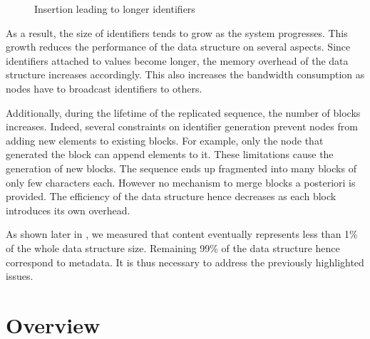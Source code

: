 \documentclass[10pt,journal,compsoc]{IEEEtran}
\let\MYoriglatexcaption\caption
\renewcommand{\caption}[2][\relax]{\MYoriglatexcaption[#2]{#2}}
\newcommand{\trm}[1]{\mathit{#1}}
\newcommand{\id}[3]{$\trm{#1}^{\trm{#2}}_{\trm{#3}}$}
\newcommand{\widthletter}{2em}
\begin{document}
\begin{figure}[!ht]
    \centering
    \caption{Insertion leading to longer identifiers}
    \label{fig:example-split}
\end{figure}

As a result, the size of identifiers tends to grow as the system progresses.
This growth reduces the performance of the data structure on several aspects.
Since identifiers attached to values become longer, the memory overhead of the data structure increases accordingly.
This also increases the bandwidth consumption as nodes have to broadcast identifiers to others.

Additionally, during the lifetime of the replicated sequence, the number of blocks increases.
Indeed, several constraints on identifier generation prevent nodes from adding new elements to existing blocks.
For example, only the node that generated the block can append elements to it.
These limitations cause the generation of new blocks.
The sequence ends up fragmented into many blocks of only few characters each.
However no mechanism to merge blocks a posteriori is provided.
The efficiency of the data structure hence decreases as each block introduces its own overhead.

As shown later in , we measured that content eventually represents less than 1\% of the whole data structure size.
Remaining 99\% of the data structure hence correspond to metadata.
It is thus necessary to address the previously highlighted issues.

\section{Overview}
\label{sec:overview}
\end{document}
